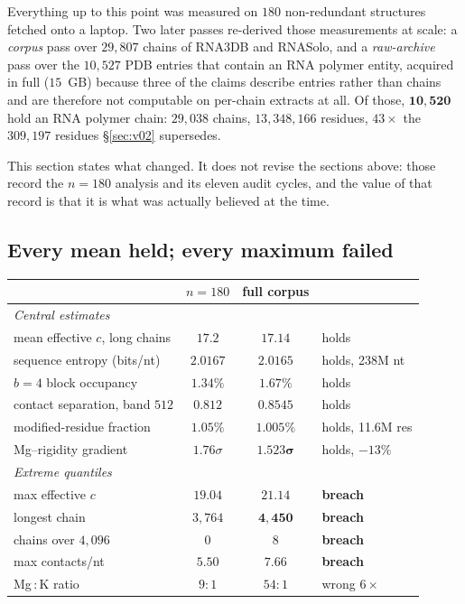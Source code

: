 \documentclass[11pt,a4paper]{article}
\begin{document}
Everything up to this point was measured on $180$ non-redundant structures
fetched onto a laptop. Two later passes re-derived those measurements at scale:
a \emph{corpus} pass over $29{,}807$ chains of RNA3DB and RNASolo, and a
\emph{raw-archive} pass over the $10{,}527$ PDB entries that contain an RNA
polymer entity, acquired in full ($15$~GB) because three of the claims describe
entries rather than chains and are therefore not computable on per-chain
extracts at all. Of those, $\mathbf{10{,}520}$ hold an RNA polymer chain:
$29{,}038$ chains, $13{,}348{,}166$ residues, $43\times$ the $309{,}197$
residues \S\ref{sec:v02} supersedes.

This section states what changed. It does not revise the sections above: those
record the $n=180$ analysis and its eleven audit cycles, and the value of that
record is that it is what was actually believed at the time.

\subsection{Every mean held; every maximum failed}

\begin{table}[h]
\centering
\small
\begin{tabular}{lccl}
\toprule
& \textbf{$n=180$} & \textbf{full corpus} & \\
\midrule
\multicolumn{4}{l}{\emph{Central estimates}}\\
mean effective $c$, long chains  & $17.2$    & $\mathbf{17.14}$ & holds \\
sequence entropy (bits/nt)       & $2.0167$  & $\mathbf{2.0165}$ & holds, 238M nt \\
$b{=}4$ block occupancy          & $1.34\%$  & $1.67\%$ & holds \\
contact separation, band $512$   & $0.812$   & $0.8545$ & holds \\
modified-residue fraction        & $1.05\%$  & $\mathbf{1.005\%}$ & holds, 11.6M res \\
Mg--rigidity gradient            & $1.76\sigma$ & $\mathbf{1.523\sigma}$ & holds, $-13\%$ \\
\midrule
\multicolumn{4}{l}{\emph{Extreme quantiles}}\\
max effective $c$                & $19.04$   & $21.14$ & \textbf{breach} \\
longest chain                    & $3{,}764$ & $\mathbf{4{,}450}$ & \textbf{breach} \\
chains over $4{,}096$            & $0$       & $8$ & \textbf{breach} \\
max contacts/nt                  & $5.50$    & $7.66$ & \textbf{breach} \\
Mg\,:\,K ratio                   & $9{:}1$   & $54{:}1$ & wrong $6\times$ \\
\bottomrule
\end{tabular}
\end{table}
\end{document}
